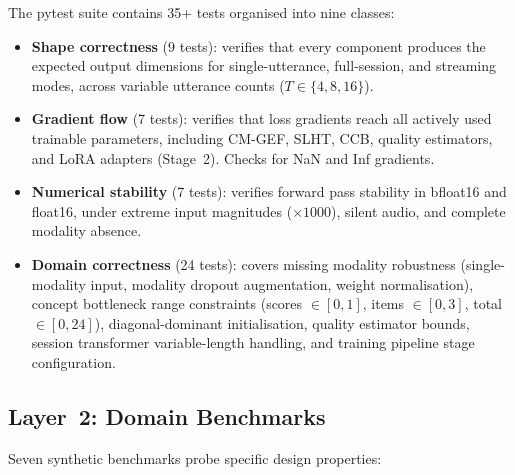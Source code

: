 \documentclass{article}
\begin{document}
The pytest suite contains 35+ tests organised into nine classes:

\begin{itemize}
  \item \textbf{Shape correctness} (9 tests): verifies that every component produces the
        expected output dimensions for single-utterance, full-session, and streaming
        modes, across variable utterance counts ($T \in \{4, 8, 16\}$).
  \item \textbf{Gradient flow} (7 tests): verifies that loss gradients reach all actively
        used trainable parameters, including CM-GEF, SLHT, CCB, quality estimators, and
        LoRA adapters (Stage~2). Checks for NaN and Inf gradients.
  \item \textbf{Numerical stability} (7 tests): verifies forward pass stability in
        bfloat16 and float16, under extreme input magnitudes ($\times 1000$), silent
        audio, and complete modality absence.
  \item \textbf{Domain correctness} (24 tests): covers missing modality robustness
        (single-modality input, modality dropout augmentation, weight normalisation),
        concept bottleneck range constraints (scores $\in [0,1]$, items $\in [0,3]$,
        total $\in [0,24]$), diagonal-dominant initialisation, quality estimator bounds,
        session transformer variable-length handling, and training pipeline stage
        configuration.
\end{itemize}

\subsection{Layer~2: Domain Benchmarks}

Seven synthetic benchmarks probe specific design properties:
\end{document}
